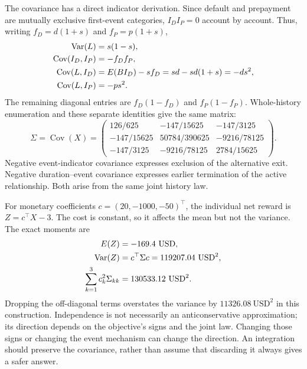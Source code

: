 The covariance has a direct indicator derivation. Since default and prepayment
are mutually exclusive first-event categories, $I_DI_P=0$ account by account.
Thus, writing $f_D=d(1+s)$ and $f_P=p(1+s)$,
\begin{align}
 \operatorname{Var}(L)&=s(1-s),\notag\\
 \operatorname{Cov}(I_D,I_P)&=-f_Df_P,\notag\\
 \operatorname{Cov}(L,I_D)
 &=E(BI_D)-s f_D=sd-sd(1+s)=-ds^2,\notag\\
 \operatorname{Cov}(L,I_P)&=-ps^2.
 \label{exec17:s5-joint-identities}
\end{align}
The remaining diagonal entries are $f_D(1-f_D)$ and $f_P(1-f_P)$.
Whole-history enumeration and these separate identities give the same matrix:
\begin{equation}
 \Sigma=\operatorname{Cov}(X)=
 \begin{pmatrix}
 126/625&-147/15625&-147/3125\\
 -147/15625&50784/390625&-9216/78125\\
 -147/3125&-9216/78125&2784/15625
 \end{pmatrix}.
 \label{exec17:s5-joint-matrix}
\end{equation}
Negative event-indicator covariance expresses exclusion of the alternative
exit. Negative duration--event covariance expresses earlier termination of
the active relationship. Both arise from the same joint history law.

For monetary coefficients $c=(20,-1000,-50)^\top$, the individual net reward
is $Z=c^\top X-3$. The cost is constant, so it affects the mean but not the
variance. The exact moments are
\begin{align}
 E(Z)&=-169.4\ \mathrm{USD},\notag\\
 \operatorname{Var}(Z)&=c^\top\Sigma c
                 =119207.04\ \mathrm{USD}^2,\notag\\
 \sum_{k=1}^3c_k^2\Sigma_{kk}&=130533.12\ \mathrm{USD}^2.
 \label{exec17:s5-joint-money}
\end{align}
Dropping the off-diagonal terms overstates the variance by
$11326.08\ \mathrm{USD}^2$ in this construction. Independence is not necessarily
an anticonservative approximation; its direction depends on the objective's
signs and the joint law. Changing those signs or changing the event mechanism
can change the direction. An integration should preserve the covariance,
rather than assume that discarding it always gives a safer answer.


